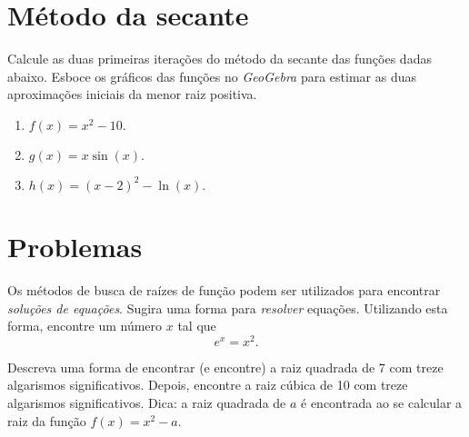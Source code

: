 \section{Método da secante}
\begin{ex}
Calcule as duas primeiras iterações do método da secante das funções dadas abaixo. Esboce os gráficos das funções no \emph{GeoGebra} para estimar as duas aproximações iniciais da menor raiz positiva.
\begin{enumerate}
\item $f(x)=x^2-10.$
\item $g(x)=x\sin(x).$
\item $h(x)=(x-2)^2-\ln(x).$
\end{enumerate}
\end{ex}


\section{Problemas}

\begin{ex}
Os métodos de busca de raízes de função podem ser utilizados para encontrar \emph{soluções de equações}. Sugira uma forma para \emph{resolver} equações. Utilizando esta forma, encontre um número $x$ tal que $$e^x=x^2.$$
\end{ex}

\begin{ex}
Descreva uma forma de encontrar (e encontre) a raiz quadrada de 7 com treze algarismos significativos. Depois, encontre a raiz cúbica de 10 com treze algarismos significativos. Dica: a raiz quadrada de $a$ é encontrada ao se calcular a raiz da função $f(x)=x^2-a$.
\end{ex}




